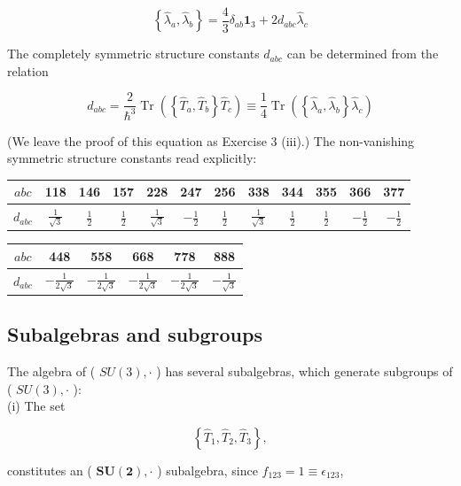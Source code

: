 \documentclass[10pt, letterpaper]{article}
\begin{document}
$$
\left\{\hat{\lambda}_{a}, \hat{\lambda}_{b}\right\}=\frac{4}{3} \delta_{a b} \mathbf{1}_{3}+2 d_{a b c} \hat{\lambda}_{c}
$$

The completely symmetric structure constants $d_{a b c}$ can be determined from the relation

$$
d_{a b c}=\frac{2}{\hbar^{3}} \operatorname{Tr}\left(\left\{\hat{T}_{a}, \hat{T}_{b}\right\} \hat{T}_{c}\right) \equiv \frac{1}{4} \operatorname{Tr}\left(\left\{\hat{\lambda}_{a}, \hat{\lambda}_{b}\right\} \hat{\lambda}_{c}\right)
$$

(We leave the proof of this equation as Exercise 3 (iii).) The non-vanishing symmetric structure constants read explicitly:

\begin{center}
\begin{tabular}{c||c|c|c|c|c|c|c|c|c|c|c}
$a b c$ & 118 & 146 & 157 & 228 & 247 & 256 & 338 & 344 & 355 & 366 & 377 \\
\hline
$d_{a b c}$ & $\frac{1}{\sqrt{3}}$ & $\frac{1}{2}$ & $\frac{1}{2}$ & $\frac{1}{\sqrt{3}}$ & $-\frac{1}{2}$ & $\frac{1}{2}$ & $\frac{1}{\sqrt{3}}$ & $\frac{1}{2}$ & $\frac{1}{2}$ & $-\frac{1}{2}$ & $-\frac{1}{2}$ \\
\hline
\end{tabular}
\end{center}

\begin{center}
\begin{tabular}{c||c|c|c|c|c}
$a b c$ & 448 & 558 & 668 & 778 & 888 \\
\hline
$d_{a b c}$ & $-\frac{1}{2 \sqrt{3}}$ & $-\frac{1}{2 \sqrt{3}}$ & $-\frac{1}{2 \sqrt{3}}$ & $-\frac{1}{2 \sqrt{3}}$ & $-\frac{1}{\sqrt{3}}$ \\
\hline
\end{tabular}
\end{center}

\subsection{Subalgebras and subgroups}
The algebra of ( $S U(3), \cdot$ ) has several subalgebras, which generate subgroups of ( $S U(3), \cdot$ ):\\
(i) The set

$$
\left\{\hat{T}_{1}, \hat{T}_{2}, \hat{T}_{3}\right\},
$$

constitutes an ( $\boldsymbol{S U}(\mathbf{2}), \cdot$ ) subalgebra, since $f_{123}=1 \equiv \epsilon_{123}$,
\end{document}
